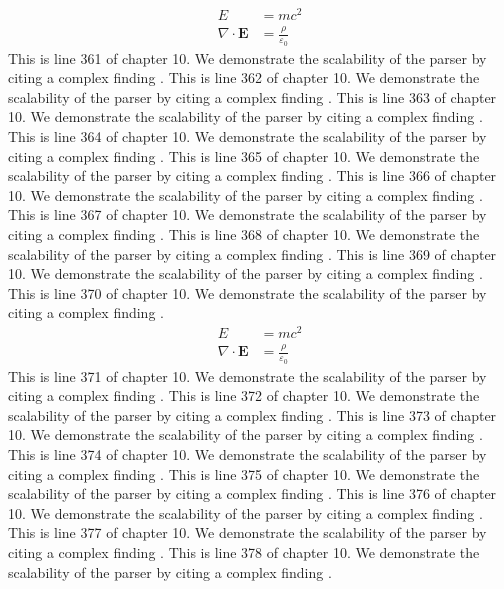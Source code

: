\begin{align*}
  E &= mc^2 \\
  \nabla \cdot \mathbf{E} &= \frac{\rho}{\varepsilon_0}
\end{align*}
This is line 361 of chapter 10. We demonstrate the scalability of the parser by citing a complex finding \cite{ref10_361}.
This is line 362 of chapter 10. We demonstrate the scalability of the parser by citing a complex finding \cite{ref10_362}.
This is line 363 of chapter 10. We demonstrate the scalability of the parser by citing a complex finding \cite{ref10_363}.
This is line 364 of chapter 10. We demonstrate the scalability of the parser by citing a complex finding \cite{ref10_364}.
This is line 365 of chapter 10. We demonstrate the scalability of the parser by citing a complex finding \cite{ref10_365}.
This is line 366 of chapter 10. We demonstrate the scalability of the parser by citing a complex finding \cite{ref10_366}.
This is line 367 of chapter 10. We demonstrate the scalability of the parser by citing a complex finding \cite{ref10_367}.
This is line 368 of chapter 10. We demonstrate the scalability of the parser by citing a complex finding \cite{ref10_368}.
This is line 369 of chapter 10. We demonstrate the scalability of the parser by citing a complex finding \cite{ref10_369}.
This is line 370 of chapter 10. We demonstrate the scalability of the parser by citing a complex finding \cite{ref10_370}.
\begin{align*}
  E &= mc^2 \\
  \nabla \cdot \mathbf{E} &= \frac{\rho}{\varepsilon_0}
\end{align*}
This is line 371 of chapter 10. We demonstrate the scalability of the parser by citing a complex finding \cite{ref10_371}.
This is line 372 of chapter 10. We demonstrate the scalability of the parser by citing a complex finding \cite{ref10_372}.
This is line 373 of chapter 10. We demonstrate the scalability of the parser by citing a complex finding \cite{ref10_373}.
This is line 374 of chapter 10. We demonstrate the scalability of the parser by citing a complex finding \cite{ref10_374}.
This is line 375 of chapter 10. We demonstrate the scalability of the parser by citing a complex finding \cite{ref10_375}.
This is line 376 of chapter 10. We demonstrate the scalability of the parser by citing a complex finding \cite{ref10_376}.
This is line 377 of chapter 10. We demonstrate the scalability of the parser by citing a complex finding \cite{ref10_377}.
This is line 378 of chapter 10. We demonstrate the scalability of the parser by citing a complex finding \cite{ref10_378}.
